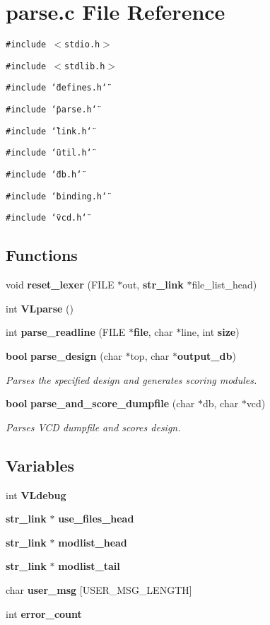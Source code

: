 \section{parse.c File Reference}
\label{parse_8c}
{\tt \#include $<$stdio.h$>$}\par
{\tt \#include $<$stdlib.h$>$}\par
{\tt \#include \char`\"{}defines.h\char`\"{}}\par
{\tt \#include \char`\"{}parse.h\char`\"{}}\par
{\tt \#include \char`\"{}link.h\char`\"{}}\par
{\tt \#include \char`\"{}util.h\char`\"{}}\par
{\tt \#include \char`\"{}db.h\char`\"{}}\par
{\tt \#include \char`\"{}binding.h\char`\"{}}\par
{\tt \#include \char`\"{}vcd.h\char`\"{}}\par
\subsection*{Functions}
\begin{CompactItemize}
\item 
void {\bf reset\_\-lexer} (FILE $\ast$out, {\bf str\_\-link} $\ast$file\_\-list\_\-head)
\item 
int {\bf VLparse} ()
\item 
int {\bf parse\_\-readline} (FILE $\ast${\bf file}, char $\ast$line, int {\bf size})
\item 
{\bf bool} {\bf parse\_\-design} (char $\ast$top, char $\ast${\bf output\_\-db})
\begin{CompactList}\small\item\em Parses the specified design and generates scoring modules.\item\end{CompactList}\item 
{\bf bool} {\bf parse\_\-and\_\-score\_\-dumpfile} (char $\ast$db, char $\ast$vcd)
\begin{CompactList}\small\item\em Parses VCD dumpfile and scores design.\item\end{CompactList}\end{CompactItemize}
\subsection*{Variables}
\begin{CompactItemize}
\item 
int {\bf VLdebug}
\item 
{\bf str\_\-link} $\ast$ {\bf use\_\-files\_\-head}
\item 
{\bf str\_\-link} $\ast$ {\bf modlist\_\-head}
\item 
{\bf str\_\-link} $\ast$ {\bf modlist\_\-tail}
\item 
char {\bf user\_\-msg} [USER\_\-MSG\_\-LENGTH]
\item 
int {\bf error\_\-count}
\end{CompactItemize}


